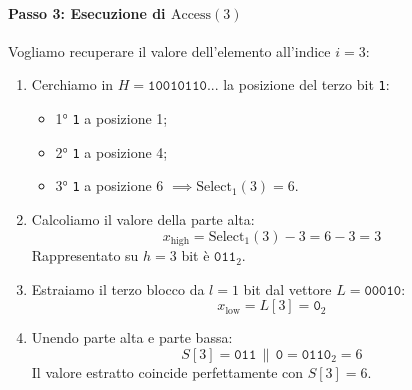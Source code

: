 \paragraph{Passo 3: Esecuzione di $\text{Access}(3)$}
Vogliamo recuperare il valore dell'elemento all'indice $i = 3$:
\begin{enumerate}
  \item Cerchiamo in $H = \texttt{10010110...}$ la posizione del terzo bit \texttt{1}:
  \begin{itemize}
    \item 1° \texttt{1} a posizione 1;
    \item 2° \texttt{1} a posizione 4;
    \item 3° \texttt{1} a posizione 6 $\implies \text{Select}_1(3) = 6$.
  \end{itemize}
  \item Calcoliamo il valore della parte alta:
  \begin{equation*}
    x_{\text{high}} = \text{Select}_1(3) - 3 = 6 - 3 = 3
  \end{equation*}
  Rappresentato su $h = 3$ bit \`e $\texttt{011}_2$.
  \item Estraiamo il terzo blocco da $l = 1$ bit dal vettore $L = \texttt{00010}$:
  \begin{equation*}
    x_{\text{low}} = L[3] = \texttt{0}_2
  \end{equation*}
  \item Unendo parte alta e parte bassa:
  \begin{equation*}
    S[3] = \texttt{011} \,\|\, \texttt{0} = \texttt{0110}_2 = 6
  \end{equation*}
  Il valore estratto coincide perfettamente con $S[3] = 6$.
\end{enumerate}

